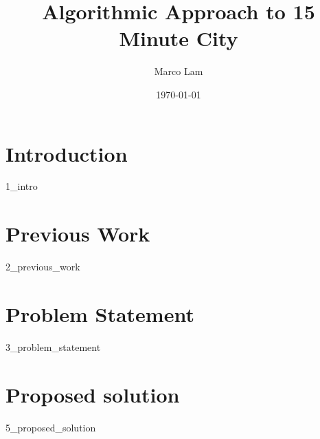 \documentclass{article}
\title{Algorithmic Approach to 15 Minute City}
\author{Marco Lam}
\date{\today}
\begin{document}
\maketitle

\newpage

\tableofcontents

\newpage

\section{Introduction}

{1_intro}

\section{Previous Work}

{2_previous_work}

\section{Problem Statement}

{3_problem_statement}



\section{Proposed solution}

{5_proposed_solution}


\end{document}
